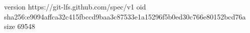 version https://git-lfs.github.com/spec/v1
oid sha256:e9094affca32c415fbccd9baa3c87533e1a15296f5b0ed30c766e80152bcd76a
size 69548
